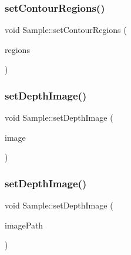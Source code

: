 \subsubsection{\texorpdfstring{set\+Contour\+Regions()}{setContourRegions()}}
{\footnotesize\ttfamily void Sample\+::set\+Contour\+Regions (\begin{DoxyParamCaption}\item[{const \hyperlink{_contour_regions_8h_a3a7590ecfb061e3c09270d38b53671ef}{Contour\+Regions\+Ptr} \&}]{regions }\end{DoxyParamCaption})}

\mbox{\label{struct_sample_a1a140ca4aa294de160581251fe5072e5}} 
\subsubsection{\texorpdfstring{set\+Depth\+Image()}{setDepthImage()}\hspace{0.1cm}{\footnotesize\ttfamily [1/2]}}
{\footnotesize\ttfamily void Sample\+::set\+Depth\+Image (\begin{DoxyParamCaption}\item[{const cv\+::\+Mat \&}]{image }\end{DoxyParamCaption})}

\mbox{\label{struct_sample_aa56728d1891ddc907d6d379f44deada3}} 
\subsubsection{\texorpdfstring{set\+Depth\+Image()}{setDepthImage()}\hspace{0.1cm}{\footnotesize\ttfamily [2/2]}}
{\footnotesize\ttfamily void Sample\+::set\+Depth\+Image (\begin{DoxyParamCaption}\item[{const std\+::string \&}]{image\+Path }\end{DoxyParamCaption})}

\mbox{\label{struct_sample_a9654dcf85e7a0b19b7b462cd7e6e1e6a}} 
